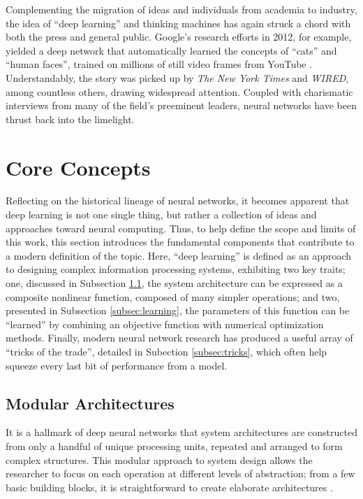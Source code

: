 Complementing the migration of ideas and individuals from academia to industry, the idea of ``deep learning'' and thinking machines has again struck a chord with both the press and general public.
Google's research efforts in 2012, for example, yielded a deep network that automatically learned the concepts of ``cats'' and ``human faces'', trained on millions of still video frames from YouTube \cite{Le2012Building}.
Understandably, the story was picked up by \emph{The New York Times} and \emph{WIRED}, among countless others, drawing widespread attention.
Coupled with charismatic interviews from many of the field's preeminent leaders, neural networks have been thrust back into the limelight. %


\section{Core Concepts}
\label{sec:deep_core}

Reflecting on the historical lineage of neural networks, it becomes apparent that deep learning is not one single thing, but rather a collection of ideas and approaches toward neural computing.
Thus, to help define the scope and limits of this work, this section introduces the fundamental components that contribute to a modern definition of the topic.
Here, ``deep learning'' is defined as an approach to designing complex information processing systems, exhibiting two key traits;
one, discussed in Subsection \ref{subsec:architectures}, the system architecture can be expressed as a composite nonlinear function, composed of many simpler operations;
and two, presented in Subsection \ref{subsec:learning}, the parameters of this function can be ``learned'' by combining an objective function with numerical optimization methods.
Finally, modern neural network research has produced a useful array of ``tricks of the trade'', detailed in Subection \ref{subsec:tricks}, which often help squeeze every last bit of performance from a model.


\subsection{Modular Architectures}
\label{subsec:architectures}

It is a hallmark of deep neural networks that system architectures are constructed from only a handful of unique processing units, repeated and arranged to form complex structures.
This modular approach to system design allows the researcher to focus on each operation at different levels of abstraction;
from a few basic building blocks, it is straightforward to create elaborate architectures \cite{Szegedy2014Going}.

